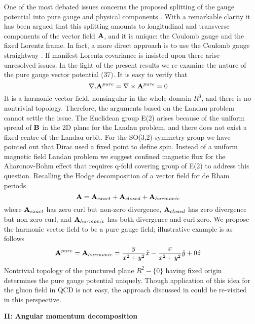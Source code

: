 \documentclass[aps, singlecolumn, showpacs]{revtex4-2}
\begin{document}
One of the most debated issues concerns the proposed splitting of the gauge potential into pure gauge and physical components \cite{1}. With a remarkable clarity \cite{3,7,8} it has been argued that this splitting amounts to longitudinal and transverse components of the vector field ${\bf A}$, and it is unique:  the Coulomb gauge and the fixed Lorentz frame. In fact, a more direct approach is to use the Coulomb gauge straightway \cite{23}. If manifest Lorentz covariance is insisted upon there arise unresolved issues. In the light of the present results we re-examine the nature of the pure gauge vector potential (37). It is easy to verify that
\begin{equation}
{\bf \nabla}.{\bf A}^{pure}={\bf \nabla} \times {\bf A}^{pure}=0
\end{equation}
It is a harmonic vector field, nonsingular in the whole domain $R^3$, and there is no nontrivial topology. Therefore, the arguments based on the Landau problem \cite{7,8} cannot settle the issue. The Euclidean group E(2) arises because of the uniform spread of ${\bf B}$ in the 2D plane for the Landau problem, and there does not exist a fixed centre of the Landau orbit. For the SO(3,2) symmetry group we have pointed out that Dirac used a fixed point to define spin. Instead of a uniform magnetic field Landau problem we suggest confined magnetic flux for the Aharonov-Bohm effect that requires q-fold covering group of E(2) \cite{28} to address this question. Recalling the Hodge decomposition of a vector field for de Rham periods \cite{10,35}
\begin{equation}
{\bf A} = {\bf A}_{exact} +{\bf A}_{closed} + {\bf A}_{harmonic}
\end{equation}
where ${\bf A}_{exact}$ has zero curl but non-zero divergence, ${\bf A}_{closed}$ has zero divergence but non-zero curl, and ${\bf A}_{harmonic}$ has both divergence and curl zero. We propose the harmonic vector field to be a pure gauge field; illustrative example is as follows
\begin{equation}
{\bf A}^{pure} = {\bf A}_{harmonic} = \frac{y}{x^2+y^2} \hat{x} -  \frac{x}{x^2+y^2} \hat{y}+0 \hat{z}
\end{equation}
Nontrivial topology of the punctured plane $R^2 -\{0\}$ having fixed origin determines the pure gauge potential uniquely. Though application of this idea for the gluon field in QCD is not easy, the approach discussed in \cite{10} could be re-visited in this perspective.

{\bf II: Angular momentum decomposition}
\end{document}

